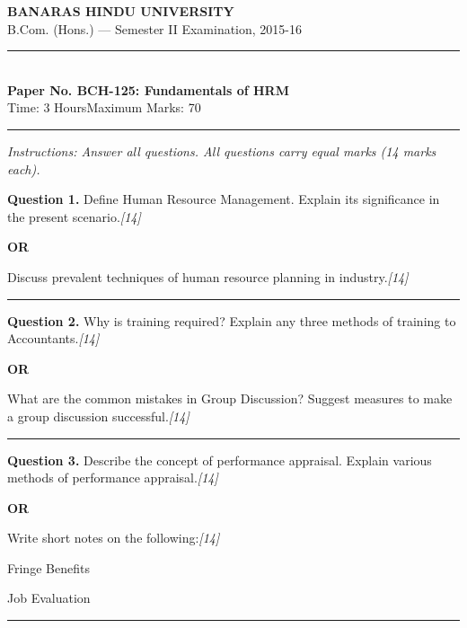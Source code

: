 \documentclass[11pt,a4paper]{article}
\newcommand{\pts}[1]{\hfill   \textit{[#1]}}
\begin{document}
\begin{center}
  {\large\bfseries BANARAS HINDU UNIVERSITY}\\[2pt]
  {\normalsize B.Com. (Hons.) --- Semester II Examination, 2015-16}\\[6pt]
  \rule{0.8\linewidth}{0.5pt}\\[6pt]
  {\large\bfseries Paper No. BCH-125: Fundamentals of HRM}\\[4pt]
  {\normalsize Time: 3 Hours\hfill Maximum Marks: 70}
\end{center}

\rule{\linewidth}{0.4pt}

\smallskip



\noindent   \textit{Instructions: Answer all questions. All questions carry equal marks (14 marks each).}

\bigskip




\noindent   \textbf{Question 1.}
Define Human Resource Management. Explain its significance in the present scenario.\pts{14}

\centerline{   \textbf{OR}}

Discuss prevalent techniques of human resource planning in industry.\pts{14}

\medskip\rule{\linewidth}{0.2pt}




\noindent   \textbf{Question 2.}
Why is training required? Explain any three methods of training to Accountants.\pts{14}

\centerline{   \textbf{OR}}

What are the common mistakes in Group Discussion? Suggest measures to make a group discussion successful.\pts{14}

\medskip\rule{\linewidth}{0.2pt}




\noindent   \textbf{Question 3.}
Describe the concept of performance appraisal. Explain various methods of performance appraisal.\pts{14}

\centerline{   \textbf{OR}}

Write short notes on the following:\pts{14}

\begin{parts}
  \item Fringe Benefits
  \item Job Evaluation
\end{parts}

\medskip\rule{\linewidth}{0.2pt}
\end{document}
